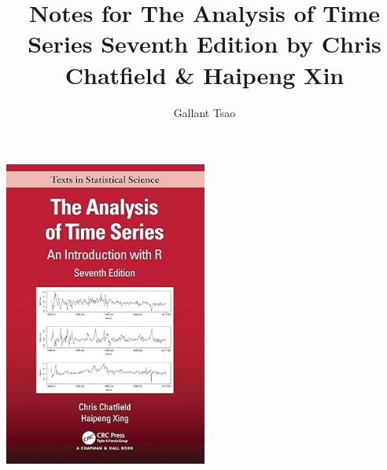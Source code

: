 \documentclass{notetemplate}
\title{Notes for The Analysis of Time Series Seventh Edition by Chris Chatfield \& Haipeng Xin}
\author{Gallant Tsao}
\begin{document}
\begin{titlingpage}
\maketitle
\begin{center}
	\includegraphics[width=0.5\textwidth]{tats.jpg}
\end{center}
\end{titlingpage}

{\color{blue} \tableofcontents}















\end{document}
